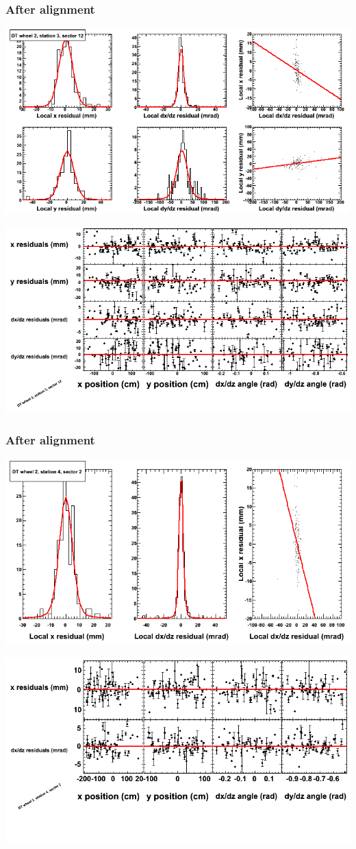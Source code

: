 \documentclass[compress]{beamer}
\begin{document}
\begin{frame}
\frametitle{After alignment}
\includegraphics[width=0.7\linewidth]{NOV4_fitfunctions/MBwhEst3sec12_bellcurves.png}

\includegraphics[width=0.7\linewidth]{NOV4_fitfunctions/MBwhEst3sec12_polynomials.png}
\end{frame}

\begin{frame}
\frametitle{After alignment}
\includegraphics[width=0.7\linewidth]{NOV4_fitfunctions/MBwhEst4sec02_bellcurves.png}

\includegraphics[width=0.7\linewidth]{NOV4_fitfunctions/MBwhEst4sec02_polynomials.png}
\end{frame}
\end{document}
